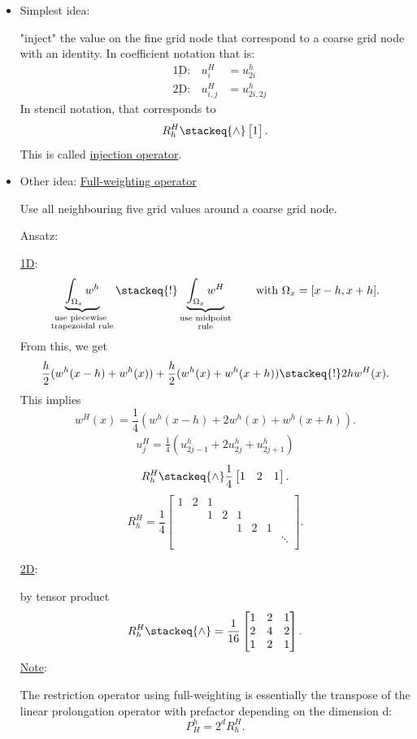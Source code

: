 \begin{itemize}
	\item Simplest idea:

		"inject" the value on the fine grid node that correspond to a coarse grid node with an identity. In coefficient notation that is:
		\begin{align*}
			&\underline{\text{1D}}:& u_{i}^{H} &= u_{2i}^{h} \\
			&\underline{\text{2D}}:& u_{i,j}^{H} &= u_{2i, 2j}^{h}
		\end{align*}
		In stencil notation, that corresponds to
		\[
			R_{h}^{H} \stackeq{\wedge} \begin{bmatrix}
				1
			\end{bmatrix}
		.\] 
		This is called \underline{injection operator}. 

	\item Other idea: \underline{Full-weighting operator} 

		Use all neighbouring five grid values around a coarse grid node.

		Ansatz:

		\underline{1D}:
		\[
			\underbrace{\int_{\Omega_{x}}w^{h}}_{\substack{\text{use
			piecewise }\\\text{trapezoidal rule}}}
			\stackeq{!}
			\underbrace{\int_{\Omega_{x}}w^{H}}_{\substack{\text{use
			midpoint}\\\text{rule}}} \qquad \text{with }
			\Omega_{x} = [x-h, x+h]  
		.\] 
		From this, we get
		\[
			\frac{h}{2}(w^{h}(x-h) + w^{h}(x)) + \frac{h}{2}(w^{h}(x) + w^{h}(x+h)) \stackeq{!} 2hw^{H}(x) \\
		.\] 
		This implies
		\[
			w^{H}(x) = \frac{1}{4}(w^{h}(x-h)+2w^{h}(x) + w^{h}(x+h))
		.\] 
		\begin{align*}
			u_{j}^{H}= \frac{1}{4}(u_{2j-1}^{h}+2u_{2j}^{h}+ u_{2j+1}^{h})
		\end{align*}
		\[
			R_{h}^{H}\stackeq{\wedge}\frac{1}{4}\begin{bmatrix}
				1 & 2 & 1
			\end{bmatrix}
		.\] 
		\[
			R_{h}^{H}= \frac{1}{4}\begin{bmatrix}
				1 & 2 & 1 \\
				  &   & 1 & 2 & 1 \\
				  &   &   &   & 1 & 2 & 1 \\
				  &   &   &   &   &   &   & \ddots \\
			\end{bmatrix}
		.\] 

		\underline{2D}:

		by tensor product
		\[
			R_{h}^{H}\stackeq{\wedge}=\frac{1}{16}\begin{bmatrix}
				1 & 2 & 1 \\
				2 & 4 & 2 \\
				1 & 2 & 1
			\end{bmatrix}
		.\] 
		\underline{Note}:

		The restriction operator using full-weighting is essentially the transpose of the linear prolongation operator with prefactor depending on the dimension d:
		\[
			P_{H}^{h} = 2^{d}R_{h}^{H}
		.\] 
\end{itemize}

